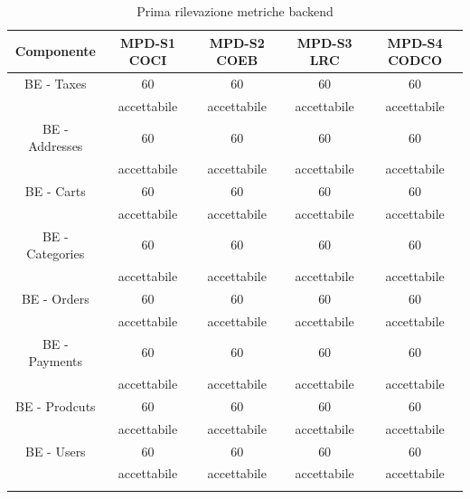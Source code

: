 \newpage

\begin{center}
    \begin{longtable}{|c|c|c|c|c|}
        \hline
        \rowcolor{lighter-grayer}
        \textbf{Componente}         & \textbf{MPD-S1 COCI}  & \textbf{MPD-S2 COEB} & \textbf{MPD-S3 LRC} & \textbf{MPD-S4 CODCO}\\
        \hline
        \endfirsthead

        \hline
        BE - Taxes & 60 & 60  & 60 & 60                       \\
         & accettabile & accettabile  & accettabile & accettabile                       \\
         BE - Addresses & 60 & 60  & 60 & 60                       \\
         & accettabile & accettabile  & accettabile & accettabile                       \\
         BE - Carts & 60 & 60  & 60 & 60                       \\
         & accettabile & accettabile  & accettabile & accettabile                       \\
         BE - Categories & 60 & 60  & 60 & 60                       \\
         & accettabile & accettabile  & accettabile & accettabile                       \\
         BE - Orders & 60 & 60  & 60 & 60                       \\
         & accettabile & accettabile  & accettabile & accettabile                       \\
         BE - Payments & 60 & 60  & 60 & 60                       \\
         & accettabile & accettabile  & accettabile & accettabile                       \\
         BE - Prodcuts & 60 & 60  & 60 & 60                       \\
         & accettabile & accettabile  & accettabile & accettabile                       \\
         BE - Users & 60 & 60  & 60 & 60                       \\
         & accettabile & accettabile  & accettabile & accettabile                       \\
        
        \hline
        \rowcolor{white}
        \caption{Prima rilevazione metriche backend}
    \end{longtable}


\end{center}
